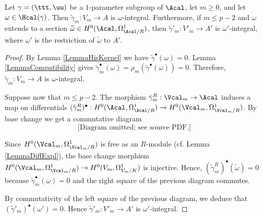 \begin{lemma}
\notready\label{Lemmawintgamma} Let $\gamma=(\ttt,\uu)$ be a $1$-parameter subgroup of $\Acal$, let $m\ge 0$, and let $\omega \in \Hcal(\gamma)$. Then $\tilde{\gamma}_m:V_m\to A$ is $\omega$-integral. Furthermore, if $m\le p-2$ and $\omega$ extends to a section $\widetilde{\omega}\in H^0(\Acal,\Omega^1_{\Acal/R})$, then $\tilde{\gamma}'_m:V'_m\to A'$ is $\omega'$-integral, where $\omega'$ is the restriction of $\widetilde{\omega}$ to $A'$.
\end{lemma}
\begin{proof} By Lemma \ref{LemmaHisKernel} we have $\tilde{\gamma}^\bullet (\omega)=0$. Lemma \ref{LemmaCompatibility} gives $\tilde{\gamma}^\bullet_m(\omega)=\rho_m(\tilde{\gamma}^\bullet (\omega))=0$. Therefore, $\tilde{\gamma}_m:V_m\to A$ is $\omega$-integral.

Suppose now that $m\le p-2$. The morphism $\tilde{\gamma}^R_m:\Vcal_m\to \Acal$ induces a map on differentials $(\tilde{\gamma}^R_m)^\bullet : H^0(\Acal,\Omega^1_{\Acal/R})\to H^0(\Vcal_m,\Omega^1_{\Vcal_m/R})$. By base change we get a commutative diagram
$$
\text{[Diagram omitted; see source PDF.]}
$$

Since $H^0(\Vcal_m,\Omega^1_{\Vcal_m/R})$ is free as an $R$-module (cf. Lemma \ref{LemmaDiffExpl}), the base change morphism $H^0(\Vcal_m,\Omega^1_{\Vcal_m/R}) \to H^0(V_m,\Omega^1_{V_m/K})$  is injective. Hence, $(\tilde{\gamma}^R_m)^\bullet(\widetilde{\omega})=0$ because $\tilde{\gamma}^\bullet_m(\omega)=0$ and the right square of the previous diagram commutes.

By commutativity of the left square of the previous diagram, we deduce that $(\tilde{\gamma}'_m)^\bullet(\omega')=0$. Hence $\tilde{\gamma}'_m:V'_m\to A'$ is $\omega'$-integral.
\end{proof}








